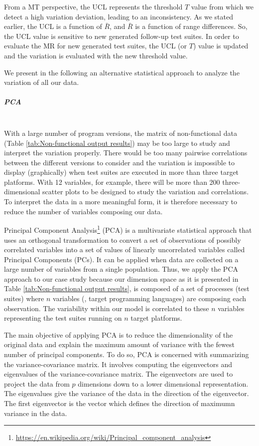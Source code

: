 From a MT perspective, the UCL represents the threshold $T$ value from which we detect a high variation deviation, leading to an inconsistency. As we stated earlier, the UCL is a function of $\bar{R}$, and $\bar{R}$ is a function of range differences. So, the UCL value is sensitive to new generated follow-up test suites. In order to evaluate the MR for new generated test suites, the UCL (or $T$) value is updated and the variation is evaluated with the new threshold value. 

We present in the following an alternative statistical approach to analyze the variation of all our data.


\subparagraph{PCA}~\\
With a large number of program versions, the matrix of non-functional data (Table \ref{tab:Non-functional output results}) may be too large to study and interpret the variation properly. There would be too many pairwise correlations between the different versions to consider and the variation is impossible to display (graphically) when test suites are executed in more than three target platforms.
With 12 variables, for example, there will be more than 200 three-dimensional scatter plots to be designed to study the variation and correlations.
To interpret the data in a more meaningful form, it is therefore necessary to reduce the number of variables composing our data.

Principal Component Analysis\footnote{\url{https://en.wikipedia.org/wiki/Principal_component_analysis}} (PCA) is a multivariate statistical approach that uses an orthogonal transformation to convert a set of observations of possibly correlated variables into a set of values of linearly uncorrelated variables called Principal Components (PCs). It can be applied when data are collected on a large number of variables from a single population. Thus, we apply the PCA approach to our case study because our dimension space as it is presented in Table \ref{tab:Non-functional output results}, is composed of a set of processes (test suites) where $n$ variables (\eg, target programming languages) are composing each observation. The variability within our model is correlated to these $n$ variables representing the test suites running on $n$ target platforms. 

The main objective of applying PCA is to reduce the dimensionality of the original data and explain the maximum amount of variance with the fewest number of principal components. To do so, PCA is concerned with summarizing the variance-covariance matrix. It involves computing the eigenvectors and eigenvalues of the variance-covariance matrix. The eigenvectors are used to project the data from $p$ dimensions down to a lower dimensional representation. The eigenvalues give the variance of the data in the direction of the eigenvector. The first eigenvector is the vector which defines the direction of maximumn variance in the data.

